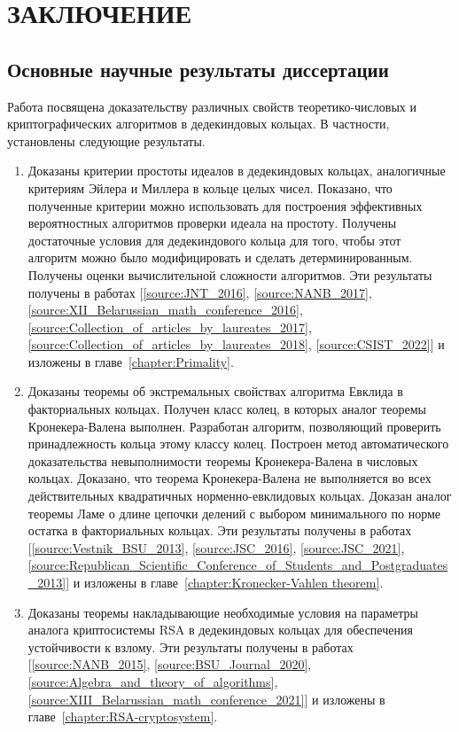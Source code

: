\documentclass[_00_dissertation.tex]{subfiles}
\begin{document}
\onlyinsubfile{
    \renewcommand{\contentsname}{ОГЛАВЛЕНИЕ}
    \setcounter{tocdepth}{3}
    \tableofcontents
}

\chapter*{\MakeUppercase{Заключение}}

\section*{Основные научные результаты диссертации}

Работа посвящена доказательству различных свойств теоретико-числовых и криптографических алгоритмов в дедекиндовых кольцах.
В частности, установлены следующие результаты.
\begin{enumerate}
    \item Доказаны критерии простоты идеалов в дедекиндовых кольцах, аналогичные критериям Эйлера и Миллера в кольце целых чисел.
    Показано, что полученные критерии можно использовать для построения эффективных вероятностных алгоритмов проверки идеала на простоту.
    Получены достаточные условия для дедекиндового кольца для того, чтобы этот алгоритм можно было модифицировать и сделать детерминированным.
    Получены оценки вычислительной сложности алгоритмов.
    Эти результаты получены в работах [\ref{source:JNT_2016}, \ref{source:NANB_2017}, \ref{source:XII_Belarussian_math_conference_2016}, \ref{source:Collection_of_articles_by_laureates_2017}, \ref{source:Collection_of_articles_by_laureates_2018}, \ref{source:CSIST_2022}] и изложены в главе~\ref{chapter:Primality}.

    \item Доказаны теоремы об экстремальных свойствах алгоритма Евклида в факториальных кольцах.
    Получен класс колец, в которых аналог теоремы Кронекера-Валена выполнен.
    Разработан алгоритм, позволяющий проверить принадлежность кольца этому классу колец.
    Построен метод автоматического доказательства невыполнимости теоремы Кронекера-Валена в числовых кольцах.
    Доказано, что теорема Кронекера-Валена не выполняется во всех действительных квадратичных норменно-евклидовых кольцах.
    Доказан аналог теоремы Ламе о длине цепочки делений с выбором минимального по норме остатка в факториальных кольцах.
    Эти результаты получены в работах [\ref{source:Vestnik_BSU_2013}, \ref{source:JSC_2016}, \ref{source:JSC_2021}, \ref{source:Republican_Scientific_Conference_of_Students_and_Postgraduates_2013}] и изложены в главе~\ref{chapter:Kronecker-Vahlen theorem}.

    \item Доказаны теоремы накладывающие необходимые условия на параметры аналога криптосистемы RSA в дедекиндовых кольцах для обеспечения устойчивости к взлому.
    Эти результаты получены в работах [\ref{source:NANB_2015}, \ref{source:BSU_Journal_2020}, \ref{source:Algebra_and_theory_of_algorithms}, \ref{source:XIII_Belarussian_math_conference_2021}] и изложены в главе~\ref{chapter:RSA-cryptosystem}.
\end{enumerate}
\end{document}
